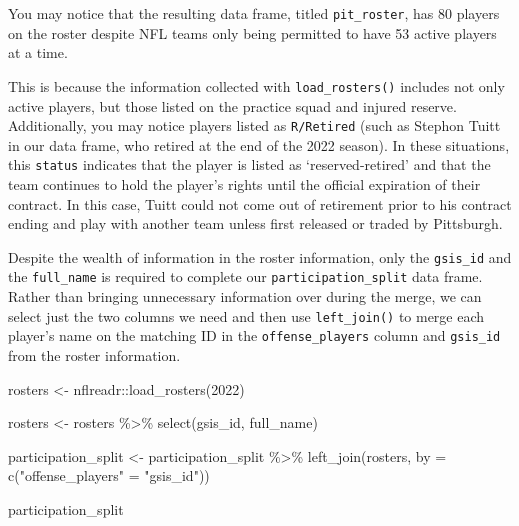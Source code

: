 \documentclass[
  letterpaper,
]{krantz}
\newenvironment{Shaded}{\begin{snugshade}}{\end{snugshade}}
\newcommand{\AttributeTok}[1]{\textcolor[rgb]{0.40,0.45,0.13}{#1}}
\newcommand{\DecValTok}[1]{\textcolor[rgb]{0.68,0.00,0.00}{#1}}
\newcommand{\FunctionTok}[1]{\textcolor[rgb]{0.28,0.35,0.67}{#1}}
\newcommand{\NormalTok}[1]{\textcolor[rgb]{0.00,0.23,0.31}{#1}}
\newcommand{\OtherTok}[1]{\textcolor[rgb]{0.00,0.23,0.31}{#1}}
\newcommand{\SpecialCharTok}[1]{\textcolor[rgb]{0.37,0.37,0.37}{#1}}
\newcommand{\StringTok}[1]{\textcolor[rgb]{0.13,0.47,0.30}{#1}}
\begin{document}
\begin{tcolorbox}[enhanced jigsaw, left=2mm, toprule=.15mm, opacitybacktitle=0.6, leftrule=.75mm, bottomrule=.15mm, colbacktitle=quarto-callout-note-color!10!white, breakable, colback=white, bottomtitle=1mm, toptitle=1mm, title=\textcolor{quarto-callout-note-color}{\faInfo}\hspace{0.5em}{Note}, coltitle=black, titlerule=0mm, arc=.35mm, opacityback=0, colframe=quarto-callout-note-color-frame, rightrule=.15mm]

You may notice that the resulting data frame, titled
\texttt{pit\_roster}, has 80 players on the roster despite NFL teams
only being permitted to have 53 active players at a time.

This is because the information collected with \texttt{load\_rosters()}
includes not only active players, but those listed on the practice squad
and injured reserve. Additionally, you may notice players listed as
\texttt{R/Retired} (such as Stephon Tuitt in our data frame, who retired
at the end of the 2022 season). In these situations, this
\texttt{status} indicates that the player is listed as
`reserved-retired' and that the team continues to hold the player's
rights until the official expiration of their contract. In this case,
Tuitt could not come out of retirement prior to his contract ending and
play with another team unless first released or traded by Pittsburgh.

\end{tcolorbox}

Despite the wealth of information in the roster information, only the
\texttt{gsis\_id} and the \texttt{full\_name} is required to complete
our \texttt{participation\_split} data frame. Rather than bringing
unnecessary information over during the merge, we can select just the
two columns we need and then use \texttt{left\_join()} to merge each
player's name on the matching ID in the \texttt{offense\_players} column
and \texttt{gsis\_id} from the roster information.

\begin{Shaded}
\begin{Highlighting}[]
\NormalTok{rosters }\OtherTok{\textless{}{-}}\NormalTok{ nflreadr}\SpecialCharTok{::}\FunctionTok{load\_rosters}\NormalTok{(}\DecValTok{2022}\NormalTok{)}

\NormalTok{rosters }\OtherTok{\textless{}{-}}\NormalTok{ rosters }\SpecialCharTok{\%\textgreater{}\%}
  \FunctionTok{select}\NormalTok{(gsis\_id, full\_name)}

\NormalTok{participation\_split }\OtherTok{\textless{}{-}}\NormalTok{ participation\_split }\SpecialCharTok{\%\textgreater{}\%}
  \FunctionTok{left\_join}\NormalTok{(rosters, }\AttributeTok{by =} \FunctionTok{c}\NormalTok{(}\StringTok{"offense\_players"} \OtherTok{=} \StringTok{"gsis\_id"}\NormalTok{))}

\NormalTok{participation\_split}
\end{Highlighting}
\end{Shaded}
\end{document}
